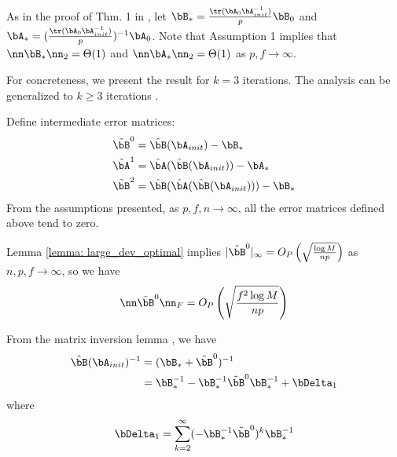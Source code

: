 \begin{IEEEproof}

As in the proof of Thm. 1 in \cite{EstCovMatKron}, let $\bB_* = \frac{\tr(\bA_0\bA_{init}^{-1})}{p} \bB_0$ and $\bA_* = (\frac{\tr(\bA_0\bA_{init}^{-1})}{p})^{-1} \bA_0$. Note that Assumption 1 implies that $\nn \bB_* \nn_2 = \Theta(1)$ and $\nn \bA_* \nn_2=\Theta(1)$ as $p,f\to\infty$.

For concreteness, we present the result for $k=3$ iterations. The analysis can be generalized to $k\geq 3$ iterations \cite{TsiligkaridisTSP}.

Define intermediate error matrices:
\begin{align*}
	\tilde{\bB}^0 &= \hat{\bB}(\bA_{init}) - \bB_* \\
	\tilde{\bA}^1 &= \hat{\bA}(\hat{\bB}(\bA_{init})) - \bA_* \\
	\tilde{\bB}^2 &= \hat{\bB}(\hat{\bA}(\hat{\bB}(\bA_{init}))) - \bB_*
\end{align*}
From the assumptions presented, as $p,f,n\to\infty$, all the error matrices defined above tend to zero.

Lemma \ref{lemma: large_dev_optimal} implies $|\tilde{\bB}^0|_\infty=O_P\left(\sqrt{ \frac{\log M}{np}} \right)$ as $n,p,f\to\infty$, so we have
\begin{equation} \label{B_0_Frob}
	\nn \tilde{\bB}^0 \nn_F = O_P\left( \sqrt{\frac{f^2\log M}{np}} \right)
\end{equation}

From the matrix inversion lemma \cite{HornJohnson}, we have
\begin{align}
	\hat{\bB}(\bA_{init})^{-1} &= (\bB_* + \tilde{\bB}^0)^{-1} \nonumber \\ 
		&= \bB_*^{-1} - \bB_*^{-1} \tilde{\bB}^0 \bB_*^{-1} + \bDelta_1 \label{mil_1}
\end{align}
where
\begin{equation*}
	\bDelta_1 = \sum_{k=2}^\infty (-\bB_*^{-1}\tilde{\bB}^0)^k \bB_*^{-1}
\end{equation*}


\end{IEEEproof}
